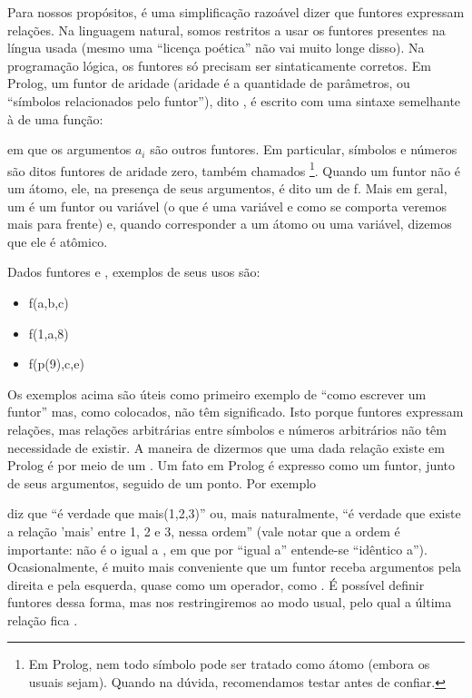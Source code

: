 \documentclass{article}
\begin{document}
Para nossos propósitos, é uma simplificação razoável dizer que
funtores expressam relações. Na linguagem natural, somos restritos a
usar os funtores presentes na língua usada (mesmo uma ``licença
poética'' não vai muito longe disso).  Na programação lógica, os
funtores só precisam ser sintaticamente corretos. Em Prolog, um funtor
 de aridade  (aridade é a quantidade de
parâmetros, ou ``símbolos relacionados pelo funtor''), dito
, é escrito com uma sintaxe semelhante à de uma função:


\noindent em que os argumentos $a_i$ são outros funtores. Em
particular, símbolos e números são ditos funtores de aridade zero,
também chamados \footnote{Em Prolog, nem todo
símbolo pode ser tratado como átomo (embora os usuais sejam). Quando
na dúvida, recomendamos testar antes de confiar.}. Quando um funtor
 não é um átomo, ele, na presença de seus argumentos, é
dito um  de 
f. Mais em geral, um  é um funtor ou variável (o que
é uma variável e como se comporta veremos mais para frente) e, quando
corresponder a um átomo ou uma variável, dizemos que ele é atômico.

Dados funtores  e , exemplos de seus usos são:

\begin{itemize}
  \item f(a,b,c)
  \item f(1,a,8)
  \item f(p(9),c,e)
\end{itemize}

Os exemplos acima são úteis como primeiro exemplo de ``como escrever
um funtor'' mas, como colocados, não têm significado. Isto porque
funtores expressam relações, mas relações arbitrárias entre símbolos e
números arbitrários não têm necessidade de existir.  A maneira de
dizermos que uma dada relação existe em Prolog é por meio de um
. Um fato em Prolog é expresso como um funtor, junto
de seus argumentos, seguido de um ponto. Por exemplo


\noindent diz que ``é verdade que mais(1,2,3)'' ou, mais naturalmente,
``é verdade que existe a relação 'mais' entre 1, 2 e 3, nessa ordem''
(vale notar que a ordem é importante:  não é o
igual a , em que por ``igual a'' entende-se
``idêntico a'').  Ocasionalmente, é muito mais conveniente que um
funtor receba argumentos pela direita e pela esquerda, quase como um
operador, como . É possível definir funtores dessa
forma, mas nos restringiremos ao modo usual, pelo qual a última
relação fica .
\end{document}

